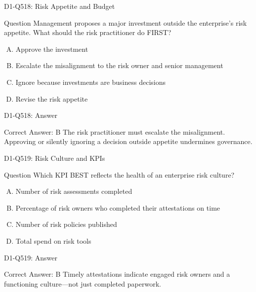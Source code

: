 \documentclass{beamer}
\begin{document}
\begin{frame}{D1-Q518: Risk Appetite and Budget}
	\begin{block}{Question}
		Management proposes a major investment outside the enterprise's risk appetite. What should the risk practitioner do FIRST?
	\end{block}
	\begin{enumerate}[(A)]
		\item Approve the investment
		\item Escalate the misalignment to the risk owner and senior management
		\item Ignore because investments are business decisions
		\item Revise the risk appetite
	\end{enumerate}
\end{frame}
\begin{frame}{D1-Q518: Answer}
	\begin{block}{Correct Answer: B}
		The risk practitioner must escalate the misalignment. Approving or silently ignoring a decision outside appetite undermines governance.
	\end{block}
\end{frame}

\begin{frame}{D1-Q519: Risk Culture and KPIs}
	\begin{block}{Question}
		Which KPI BEST reflects the health of an enterprise risk culture?
	\end{block}
	\begin{enumerate}[(A)]
		\item Number of risk assessments completed
		\item Percentage of risk owners who completed their attestations on time
		\item Number of risk policies published
		\item Total spend on risk tools
	\end{enumerate}
\end{frame}
\begin{frame}{D1-Q519: Answer}
	\begin{block}{Correct Answer: B}
		Timely attestations indicate engaged risk owners and a functioning culture—not just completed paperwork.
	\end{block}
\end{frame}
\end{document}
